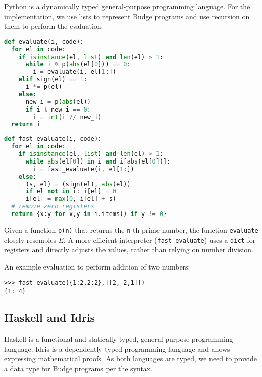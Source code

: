 \documentclass{article}
\begin{document}
Python\cite{b5} is a dynamically typed general-purpose programming language. For the implementation, we use lists to represent Budge programs and use recursion on them to perform the evaluation.

\begin{minipage}{0.49\textwidth}
\begin{lstlisting}[language=Python]
def evaluate(i, code):
  for el in code:
    if isinstance(el, list) and len(el) > 1:
      while i % p(abs(el[0])) == 0:
        i = evaluate(i, el[1:])
    elif sign(el) == 1:
      i *= p(el)
    else:
      new_i = p(abs(el))
      if i % new_i == 0:
        i = int(i // new_i)
  return i
\end{lstlisting}
\end{minipage}
\begin{minipage}{0.49\textwidth}
\begin{lstlisting}[language=Python]
def fast_evaluate(i, code):
  for el in code:
    if isinstance(el, list) and len(el) > 1:
      while abs(el[0]) in i and i[abs(el[0])]:
        i = fast_evaluate(i, el[1:])
    else:
      (s, el) = (sign(el), abs(el))
      if el not in i: i[el] = 0
      i[el] = max(0, i[el] + s)
  # remove zero registers
  return {x:y for x,y in i.items() if y != 0}
\end{lstlisting}
\end{minipage}

Given a function \texttt{p(n)} that returns the \texttt{n}-th prime number, the function \texttt{evaluate} closely resembles $E$. A more efficient interpreter (\texttt{fast\_evaluate}) uses a \texttt{dict} for registers and directly adjusts the values, rather than relying on number division.

An example evaluation to perform addition of two numbers:

\begin{verbatim}
>>> fast_evaluate({1:2,2:2},[[2,-2,1]])
{1: 4}
\end{verbatim}

\subsection{Haskell and Idris}

Haskell\cite{b6} is a functional and statically typed, general-purpose programming language. Idris\cite{b7} is a dependently typed programming language and allows expressing mathematical proofs. As both languages are typed, we need to provide a data type for Budge programs per the syntax.
\end{document}
